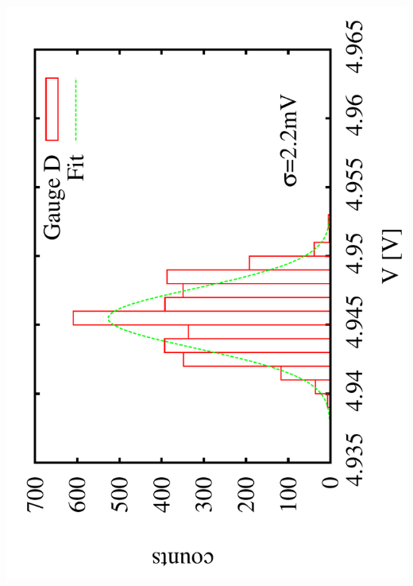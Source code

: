 \documentclass[a4paper,11pt]{book}
\begin{document}
 \includegraphics[scale=0.15,angle=-90]{image_ai_23e3.pdf}
\end{document}
